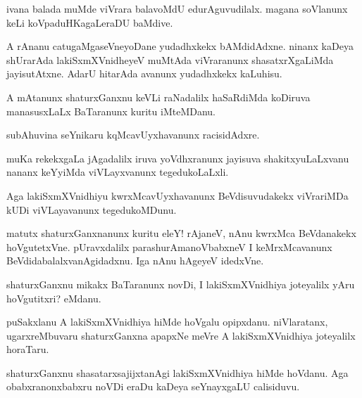 \documentclass{article}
\begin{document}
\begin{mn}%
ivana balada muMde viVrara balavoMdU edurAguvudilalx. magana soVlanunx keLi 
koVpaduHKagaLeraDU baMdive.
\end{mn}

\begin{mn}%
A rAnanu catugaMgaseVneyoDane yudadhxkekx bAMdidAdxne. ninanx kaDeya shUrarAda 
lakiSxmXVnidheyeV muMtAda viVraranunx shasatxrXgaLiMda jayisutAtxne. AdarU hitarAda 
avanunx yudadhxkekx kaLuhisu.
\end{mn}

\begin{mn}%
A mAtanunx shaturxGanxnu keVLi raNadalilx haSaRdiMda koDiruva manasusxLaLx BaTaranunx 
kuritu iMteMDanu.
\end{mn}

\begin{mn}%
subAhuvina seYnikaru kqMcavUyxhavanunx racisidAdxre.
\end{mn}

\begin{mn}%
muKa rekekxgaLa jAgadalilx iruva yoVdhxranunx jayisuva shakitxyuLaLxvanu nananx keYyiMda 
viVLayxvanunx tegedukoLaLxli.
\end{mn}

\begin{mn}%
Aga lakiSxmXVnidhiyu kwrxMcavUyxhavanunx BeVdisuvudakekx viVrariMDa kUDi viVLayavanunx 
tegedukoMDunu.
\end{mn}

\begin{mn}%
matutx shaturxGanxnanunx kuritu eleY! rAjaneV, nAnu kwrxMca BeVdanakekx hoVgutetxVne. 
pUravxdalilx parashurAmanoVbabxneV I keMrxMcavanunx BeVdidabalalxvanAgidadxnu. Iga nAnu 
hAgeyeV idedxVne.
\end{mn}

\begin{mn}%
shaturxGanxnu mikakx BaTaranunx novDi, I lakiSxmXVnidhiya joteyalilx yAru hoVgutitxri? 
eMdanu.
\end{mn}

\begin{mn}%
puSakxlanu A lakiSxmXVnidhiya hiMde hoVgalu opipxdanu. niVlaratanx, ugarxreMbuvaru 
shaturxGanxna apapxNe meVre A lakiSxmXVnidhiya joteyalilx horaTaru.
\end{mn}

\begin{mn}%
shaturxGanxnu shasatarxsajijxtanAgi lakiSxmXVnidhiya hiMde hoVdanu. Aga obabxranonxbabxru 
noVDi eraDu kaDeya seYnayxgaLU calisiduvu.
\end{mn}
\end{document}
